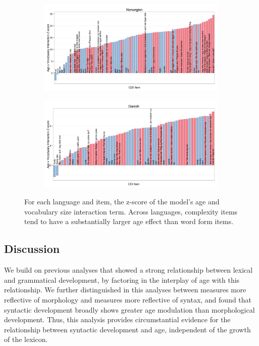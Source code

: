 \documentclass[10pt,letterpaper]{article}
\begin{document}
\begin{figure}[tb]
\begin{subfigure}[b]{0.45\textwidth}
\includegraphics[width=\textwidth]{plots/norwegian_interactions}
\end{subfigure}
\begin{subfigure}[b]{0.45\textwidth}
\includegraphics[width=\textwidth]{plots/danish_interactions}
\end{subfigure}

\caption{\label{fig:interactions} For each language and item, the z-score of the model's age and vocabulary size interaction term. Across languages, complexity items tend to have a substantially larger age effect than word form items.}

\end{figure}

\subsection{Discussion}

We build on previous analyses that showed a strong relationship between lexical and grammatical development, by factoring in the interplay of age with this relationship. We further distinguished in this analyses between measures more reflective of morphology and measures more reflective of syntax, and found that syntactic development broadly shows greater age modulation than morphological development. Thus, this analysis provides circumstantial evidence for the relationship between syntactic development and age, independent of the growth of the lexicon. 
\end{document}
